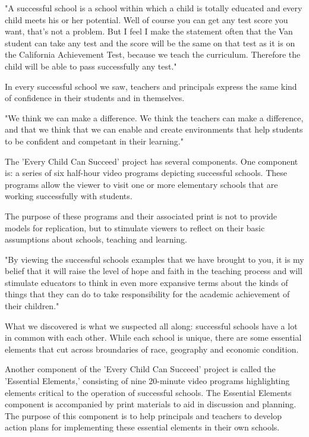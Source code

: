 "A successful school is a school within which a child is totally educated and every child meets his or her potential.
Well of course you can get any test score you want, that's not a problem.
But I feel I make the statement often that the Van student can take any test and the score will be the same on that test as it is on the California Achievement Test, because we teach the curriculum.
Therefore the child will be able to pass successfully any test."

In every successful school we saw, teachers and principals express the same kind of confidence in their students and in themselves.

"We think we can make a difference.
We think the teachers can make a difference, and that we think that we can enable and create environments that help students to be confident and competant in their learning."

The 'Every Child Can Succeed' project has several components.
One component is: a series of six half-hour video programs depicting successful schools.
These programs allow the viewer to visit one or more elementary schools that are working successfully with students.

The purpose of these programs and their associated print is not to provide models for replication, but to stimulate viewers to reflect on their basic assumptions about schools, teaching and learning.

"By viewing the successful schools examples that we have brought to you, it is my belief that it will raise the level of hope and faith in the teaching process and will stimulate educators to think in even more expansive terms about the kinds of things that they can do to take responsibility for the academic achievement of their children."

What we discovered is what we suspected all along: successful schools have a lot in common with each other.
While each school is unique, there are some essential elements that cut across broundaries of race, geography and economic condition.

Another component of the 'Every Child Can Succeed' project is called the 'Essential Elements,' consisting of nine 20-minute video programs highlighting elements critical to the operation of successful schools.
The Essential Elements component is accompanied by print materials to aid in discussion and planning.
The purpose of this component is to help principals and teachers to develop action plans for implementing these essential elements in their own schools.

